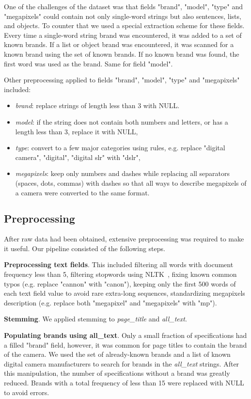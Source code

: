 \documentclass[sigconf]{acmart}
\begin{document}
One of the challenges of the dataset was that fields "brand", "model", "type" and "megapixels" could contain not only single-word strings but also sentences, lists, and objects. To counter that we used a special extraction scheme for these fields. Every time a single-word string brand was encountered, it was added to a set of known brands. If a list or object brand was encountered, it was scanned for a known brand using the set of known brands. If no known brand was found, the first word was used as the brand. Same for field "model".

Other preprocessing applied to fields "brand", "model", "type" and "megapixels" included:
\begin{itemize}
\item \textit{brand}: replace strings of length less than 3 with NULL.
\item \textit{model}: if the string does not contain both numbers and letters, or has a length less than 3, replace it with NULL,
\item \textit{type}:  convert to a few major categories using rules, e.g. replace "digital camera", "digital", "digital slr" with "dslr",
\item \textit{megapixels}: keep only numbers and dashes while replacing all separators (spaces, dots, commas) with dashes so that all ways to describe megapixels of a camera were converted to the same format.
\end{itemize}


\subsection{Preprocessing}

After raw data had been obtained, extensive preprocessing was required to make it useful. Our pipeline consisted of the following steps.

\textbf{Preprocessing text fields}. This included filtering all words with document frequency less than 5, filtering stopwords using NLTK~\cite{nltk}, fixing known common typos (e.g. replace "cannon" with "canon"), keeping only the first 500 words of each text field value to avoid rare extra-long sequences, standardizing megapixels description (e.g. replace both "megapixel" and "megapixels" with "mp").

\textbf{Stemming}. We applied stemming to \textit{page\_title} and \textit{all\_text}.

\textbf{Populating brands using all\_text}. Only a small fraction of specifications had a filled "brand" field, however, it was common for page titles to contain the brand of the camera. We used the set of already-known brands and a list of known digital camera manufacturers to search for brands in the \textit{all\_text} strings. After this manipulation, the number of specifications without a brand was greatly reduced. Brands with a total frequency of less than 15 were replaced with NULL to avoid errors.
\end{document}
